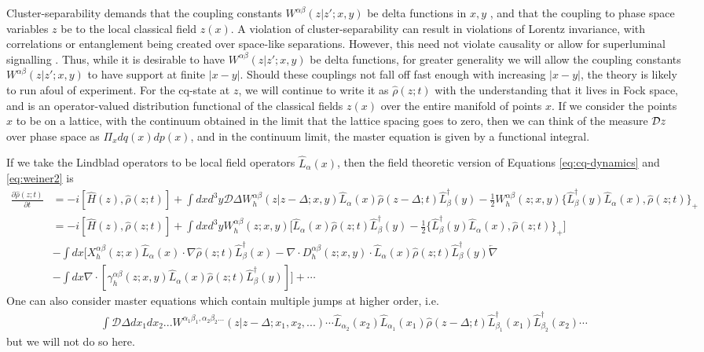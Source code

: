 \documentclass[aps,pra,showpacs,citeautoscript,amsmath,amssymb,floatfix,superscriptaddress,bbm, verbatim,amsfonts,changes,11pt,nofootinbib,longbibliography]{revtex4-2}
\def\z{{z}}
\def\L{{\hat{L}}}
\def\Hq{\hat{H}}
\def\dist{{\Delta}}
\def\ddf{{\mathcal D}\dist}
\def\rate{{W}}
\def\ab{^{\alpha\beta}}
\def\lax{{\L_\alpha(x)}}
\def\lbx{{\L^\dagger_\beta(x)}}
\def\lby{{\L^\dagger_\beta(y)}}
\def\rateabx{{\rate\ab(\z|\z';x,y)}}
\def\rateabxd{{\rate_h\ab(\z|\z-\dist;x,y)}}
\renewcommand{\varrho}{\hat{\rho}}
\def\psiz{{\varrho(\z;t)}}
\def\psizt{{\varrho(\z;t)}}
\def\psizd{{\varrho(\z-\dist;t)}}
\def\friction{\gamma}
\begin{document}
Cluster-separability \cite{cluster_foot} demands that 
the coupling constants $\rateabx$ be delta functions in $x,y$ \cite{bps}, and that the coupling to phase space variables $\z$ be to the local classical field $\z(x)$. A violation of cluster-separability can result in violations of Lorentz invariance, with correlations or entanglement being created over space-like separations. However, this need not violate causality or allow for superluminal signalling \cite{OR-intrinsic}. Thus, while it is desirable to have $\rateabx$ be delta functions,  for greater generality we will allow the coupling constants $\rateabx$ to have support at finite $|x-y|$. Should these couplings not fall off fast enough with increasing $|x-y|$, the theory is likely to run afoul of experiment.
For the cq-state at $\z$, we will continue to write it as $\psizt$ with the understanding that it lives in Fock space, and is an operator-valued distribution functional of the classical fields $\z(x)$ over the entire manifold of points $x$. If we consider the points $x$ to be on a lattice, with the continuum obtained in the limit that the lattice spacing goes to zero, then we can think of the measure ${\cal D}\z$ over phase space as $\Pi_xdq(x)dp(x)$, and in the continuum limit, the master equation is given by a functional integral. 




If we take the Lindblad operators to be local field operators $\lax$, then the field theoretic version of Equations \eqref{eq:cq-dynamics} and \eqref{eq:weiner2} is 
\begin{align}
  \frac{\partial\psiz}{\partial t}
  &=-i[\Hq(\z),\psiz]
 + \int dxd^3y\ddf
\rateabxd
\L_{\alpha}(x)\psizd\L_{\beta}^\dagger(y)
  -
\frac{1}{2}\rate_h\ab(\z;x,y)\{\lby\lax,\psiz\}_+   
\\
  &=-i[\Hq(\z),\psiz]
 + 
 \int dx d^3y
\rate_h\ab(\z;x,y)\Big[ \lax\psiz\lby
  -\frac{1}{2}
\{\L_{\beta}^\dagger(y)\L_{\alpha}(x),\psiz\}_+   
\Big]
\nonumber\\
&
-
\int dx  
\Big[  X^{\alpha\beta}_h(\z;x)
\lax\cdot\nabla \psiz\lbx
- \nabla\cdot D_h^{\alpha\beta}(\z;x,y)\cdot
\L_{\alpha}(x)
\psiz
\L_{\beta}^\dagger(y)
\overleftarrow{\nabla}\nonumber\\
&
-\int dx\nabla\cdot[
\friction^{\alpha\beta}_h(\z;x,y)
\lax\psiz\lby]
  \Big] +\cdots  
\label{eq:weinerfields}
\end{align}
One can also consider master equations which contain multiple jumps at higher order, i.e.
	\begin{align}
		\int \ddf dx_1 dx_2... \rate^{\alpha_1\beta_1,\alpha_2\beta_2...}(\z|\z-\dist;x_1,x_2,...)\cdots\L_{\alpha_2}(x_2)\L_{\alpha_1}(x_1)\psizd\L^\dagger_{\beta_1}(x_1)\L^\dagger_{\beta_2}(x_2)\cdots
		\nonumber
	\end{align}  but we will not do so here.
\end{document}
